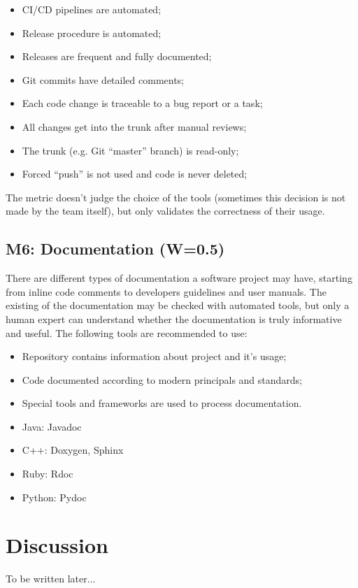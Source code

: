 \documentclass[12pt,oneside]{article}
\begin{document}
\begin{itemize}
  \item CI/CD pipelines are automated;
  \item Release procedure is automated;
  \item Releases are frequent and fully documented;
  \item Git commits have detailed comments;
  \item Each code change is traceable to a bug report or a task;
  \item All changes get into the trunk after manual reviews;
  \item The trunk (e.g. Git ``master'' branch) is read-only;
  \item Forced ``push'' is not used and code is never deleted;
\end{itemize}

The metric doesn't judge the choice of the tools (sometimes this decision
is not made by the team itself), but only validates the correctness
of their usage.

\subsection{M6: Documentation (W=0.5)}

There are different types of documentation a software project may have,
starting from inline code comments to developers guidelines and user manuals.
The existing of the documentation may be checked with automated tools,
but only a human expert can understand whether the documentation is truly
informative and useful. The following tools are recommended to use:

\begin{itemize}
  \item Repository contains information about project and it's usage;
  \item Code documented according to modern principals and standards;
  \item Special tools and frameworks are used to process documentation.
  \item Java: Javadoc
  \item C++: Doxygen, Sphinx
  \item Ruby: Rdoc
  \item Python: Pydoc
\end{itemize}

\section{Discussion}
\label{sec:discussion}

To be written later...

\raggedright

\end{document}
